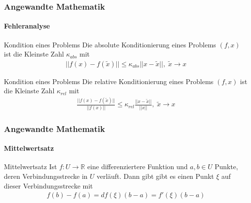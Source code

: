 \documentclass{beamer}
\begin{document}
\begin{frame}
    \frametitle{Angewandte Mathematik}
\framesubtitle{Fehleranalyse}
    \begin{block}{Kondition eines Problems}
Die absolute Konditionierung eines Problems $(f,x)$ ist die Kleinste Zahl $\kappa_{abs}$ mit 
\begin{align*}
|| f(x) - f(\widetilde{x}) || \leq \kappa_{abs} || x - \widetilde{x} || , \;  \widetilde{x} \to x
\end{align*}
\end{block}

    \begin{block}{Kondition eines Problems}
Die relative  Konditionierung eines Problems $(f,x)$ ist die Kleinste Zahl $\kappa_{rel}$ mit 
\begin{align*}
\frac{|| f(x) - f(\widetilde{x}) ||}{||f(x) || } \leq \kappa_{rel} \frac{|| x - \widetilde{x} ||}{||x||} , \; \widetilde{x} \to x
\end{align*}
\end{block}

 \end{frame}








 \begin{frame}
    \frametitle{Angewandte Mathematik}
\framesubtitle{Mittelwertsatz}
    \begin{block}{Mittelwertsatz}
Ist $f: U \to \mathbb{R}$ eine differenziertere Funktion und $a,b \in U$ Punkte, deren Verbindungsstrecke in $U$ verläuft. Dann gibt gibt es einen Punkt $\xi$ auf dieser Verbindungsstrecke mit
\begin{align*}
f(b) - f(a) = df(\xi)(b-a) = f'(\xi) (b-a)
\end{align*}
\end{block}
 \end{frame}
\end{document}
